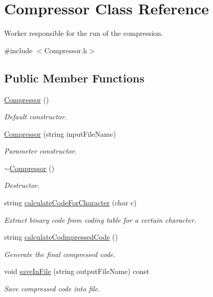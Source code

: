 \hypertarget{class_compressor}{}\section{Compressor Class Reference}
\label{class_compressor}


Worker responsible for the run of the compression.  




{\ttfamily \#include $<$Compressor.\+h$>$}

\subsection*{Public Member Functions}
\begin{DoxyCompactItemize}
\item 
\mbox{\label{class_compressor_a8a728ed1544cc0f82e8390f4606026b0}} 
\mbox{\hyperlink{class_compressor_a8a728ed1544cc0f82e8390f4606026b0}{Compressor}} ()
\begin{DoxyCompactList}\small\item\em Default constructor. \end{DoxyCompactList}\item 
\mbox{\hyperlink{class_compressor_a10146d317f26c60beef2a6ff88cd2b37}{Compressor}} (string input\+File\+Name)
\begin{DoxyCompactList}\small\item\em Parameter constructor. \end{DoxyCompactList}\item 
\mbox{\label{class_compressor_a7153be4a80054c7da7b355ff6841c0f7}} 
\mbox{\hyperlink{class_compressor_a7153be4a80054c7da7b355ff6841c0f7}{$\sim$\+Compressor}} ()
\begin{DoxyCompactList}\small\item\em Destructor. \end{DoxyCompactList}\item 
string \mbox{\hyperlink{class_compressor_a604328bbf5e70b07098547890a0963d8}{calculate\+Code\+For\+Character}} (char c)
\begin{DoxyCompactList}\small\item\em Extract binary code from coding table for a certain character. \end{DoxyCompactList}\item 
string \mbox{\hyperlink{class_compressor_a1973489d6ff8cff1458e9eff8dd0e556}{calculate\+Codmpressed\+Code}} ()
\begin{DoxyCompactList}\small\item\em Generate the final compressed code. \end{DoxyCompactList}\item 
void \mbox{\hyperlink{class_compressor_a462c120db290b92e49a566ada6ba6edf}{save\+In\+File}} (string output\+File\+Name) const
\begin{DoxyCompactList}\small\item\em Save compressed code into file. \end{DoxyCompactList}\end{DoxyCompactItemize}


